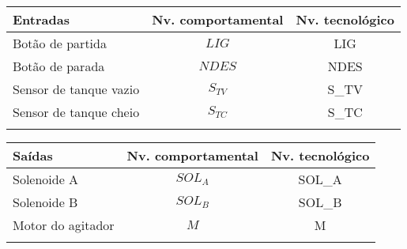 \begin{longtable}[]{@{}lcc@{}}
\toprule
Entradas & Nv. comportamental & Nv. tecnológico \\
\midrule
\endhead
Botão de partida & $LIG$ & LIG \\
Botão de parada & $NDES$ & NDES \\
Sensor de tanque vazio & \(S_{TV}\) & S\_TV \\
Sensor de tanque cheio & \(S_{TC}\) & S\_TC \\
\bottomrule
\label{tbl:5}
\end{longtable}

\begin{longtable}[]{@{}lcc@{}}
\toprule
Saídas & Nv. comportamental & Nv. tecnológico \\
\midrule
\endhead
Solenoide A & \(SOL_A\) & SOL\_A \\
Solenoide B & \(SOL_B\) & SOL\_B \\
Motor do agitador & \(M\) & M \\
\bottomrule
\label{tbl:6}
\end{longtable}

